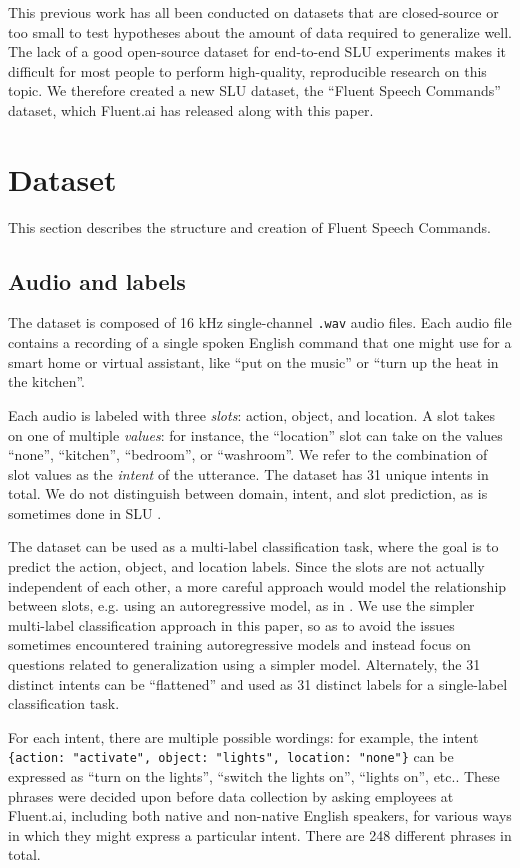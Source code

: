\documentclass[a4paper]{article}
\begin{document}
This previous work has all been conducted on datasets that are closed-source or too small to test hypotheses about the amount of data required to generalize well. The lack of a good open-source dataset for end-to-end SLU experiments makes it difficult for most people to perform high-quality, reproducible research on this topic. We therefore created a new SLU dataset, the ``Fluent Speech Commands'' dataset, which Fluent.ai has released along with this paper. 

\section{Dataset}
This section describes the structure and creation of Fluent Speech Commands.

\subsection{Audio and labels}
The dataset is composed of 16 kHz single-channel \texttt{.wav} audio files. Each audio file contains a recording of a single spoken English command that one might use for a smart home or virtual assistant, like ``put on the music'' or ``turn up the heat in the kitchen''.

Each audio is labeled with three \textit{slots}: action, object, and location. A slot takes on one of multiple \textit{values}: for instance, the ``location'' slot can take on the values ``none'', ``kitchen'', ``bedroom'', or ``washroom''. We refer to the combination of slot values as the \textit{intent} of the utterance. The dataset has 31 unique intents in total. We do not distinguish between domain, intent, and slot prediction, as is sometimes done in SLU \cite{wang2005spoken}.

The dataset can be used as a multi-label classification task, where the goal is to predict the action, object, and location labels. Since the slots are not actually independent of each other, a more careful approach would model the relationship between slots, e.g. using an autoregressive model, as in  \cite{Haghani2018}. We use the simpler multi-label classification approach in this paper, so as to avoid the issues sometimes encountered training autoregressive models and instead focus on questions related to generalization using a simpler model. Alternately, the 31 distinct intents can be ``flattened'' and used as 31 distinct labels for a single-label classification task. 

For each intent, there are multiple possible wordings: for example, the intent \texttt{\{action: "activate", object: "lights", location: "none"\}} can be expressed as ``turn on the lights'', ``switch the lights on'', ``lights on'', etc.. These phrases were decided upon before data collection by asking employees at Fluent.ai, including both native and non-native English speakers, for various ways in which they might express a particular intent. 
There are 248 different phrases in total.
\end{document}
